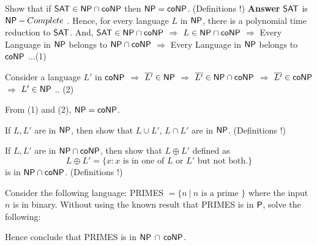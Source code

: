 \documentclass[addpoints,12pt]{exam}
\begin{document}
\begin{questions}


\question[5]
Show that if $\SAT \in \NP \cap \co\NP$ then $\NP = \co\NP$. (Definitions !)
\textbf{Answer} \newline
$\SAT$ is $\NP-Complete$ . Hence, for every language $L$ in $\NP$, there is a polynomial time reduction to $\SAT$. And,
$\SAT \in \NP \cap \co\NP$ $\Longrightarrow$ $L \in \NP \cap \co\NP$ $\Longrightarrow$ Every Language in $\NP$ belongs to $\NP \cap \co\NP$ $\Longrightarrow$ Every Language in $\NP$
 belongs to $\co\NP$ ...(1) \newline
 
 Consider a language $L'$ in $\co\NP$ $\Longrightarrow$ $\overline{L'} \in \NP$ $\Longrightarrow$ $\overline{L'} \in \NP \cap \co\NP$
 $\Longrightarrow$ $\overline{L'} \in \co\NP$ $\Longrightarrow$ $L' \in \NP$ .. (2)
 
 From (1) and (2), $\NP = \co\NP$.


\question[5]
If $L, L'$ are in $\NP$, then show that $L \cup L'$, $L \cap L'$ are in $\NP$. (Definitions !)
  
\question[5]
If $L, L'$ are in $\NP \cap \co\NP$, then show that $L \oplus  L'$ defined as 
\[ L \oplus L' = \{ x : x \textrm{ is in one of $L$ or $L'$ but not both.} \} \]
is in $\NP \cap \co\NP$. (Definitions !)

\question[15]
Consider the following language: PRIMES $= \{ n ~|~ n
\textrm{ is a prime } \}$ where the input $n$ is in binary.  Without
using the known result that PRIMES is in $\P$, solve the following:
Hence conclude that PRIMES is in $\NP$ $\cap$ $\co\NP$.


\end{questions}
\end{document}
